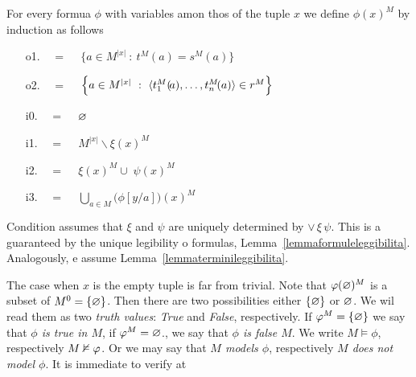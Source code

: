 \begin{definition}[ of truth]\label{defverita} For every formua $\phi$ with variables amon thos of the tuple $x$ we define \emph{$\phi(x)^M$\/} by induction as follows
\begin{itemize}
\item[o1.] \hspace*{15ex}\ \  =\ \ \  $\Big\{a\in M^{|x|}\ :\ t^M\!(a)=s^M\!(a) \Big\}$\medskip

\item[o2.] \hspace*{15ex}\ \   =\ \ \ $\Big\{a\in M^{|x|}\ :\ \<t_1^M(\!a),\dots,t_n^M\!(a)\>\in r^M\Big\}$\medskip

\item[i0.] \hspace*{15ex}\ \  =\ \ \  $\varnothing$\bigskip

\item[i1.] \hspace*{15ex}\ \   =\ \ \  $M^{|x|}\smallsetminus\xi(x)^M$\bigskip

\item[i2.] \hspace*{15ex}\ \   =\ \ \  $\xi(x)^M\cup\;\psi(x)^M$\bigskip

\item[i3.] \hspace*{15ex}\ \   =\ \ \ $\displaystyle\bigcup_{a\in M}\big(\phi[y/a]\big)(x)^M$
\end{itemize}
Condition  assumes that $\xi$ and $\psi$ are uniquely determined by $\vee\,\xi\,\psi$. This is a guaranteed by the unique legibility o formulas, Lemma~\ref{lemmaformuleleggibilita}. Analogously,  e  assume Lemma~\ref{lemmaterminileggibilita}. 
\end{definition}

The case when $x$ is the empty tuple is far from trivial. Note that $\varphi(\varnothing)^M$ is a subset of $M^0=\{\varnothing\}$. Then there are two possibilities either $\{\varnothing\}$ or $\varnothing$. We wil read them as two \emph{truth values}: \emph{True\/} and \emph{False}, respectively. If $\varphi^M=\{\varnothing\}$ we say that \emph{$\phi$ is true in $M$}, if $\varphi^M=\varnothing$., we say that \emph{$\phi$ is false $M$}. We write \emph{$M\models\phi$}, respectively \emph{$M\nvDash\varphi$}. Or we may say that \emph{$M$ models $\phi$}, respectively \emph{$M$ does not model $\phi$}. It is immediate to verify at


